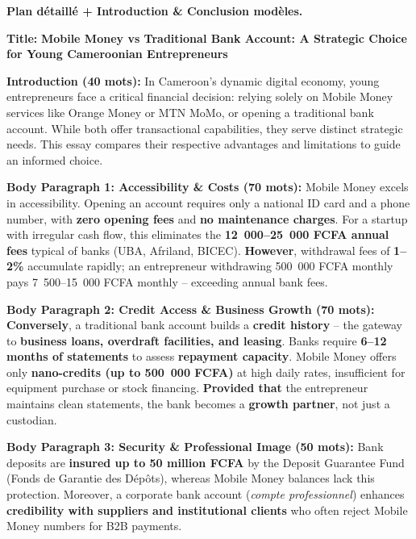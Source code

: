\documentclass[11pt]{article}
\begin{document}
\begin{exoresolu}
\textbf{Plan détaillé + Introduction \& Conclusion modèles.}

\textbf{Title:} \textbf{Mobile Money vs Traditional Bank Account: A Strategic Choice for Young Cameroonian Entrepreneurs}

\textbf{Introduction (40 mots):}
In Cameroon's dynamic digital economy, young entrepreneurs face a critical financial decision: relying solely on Mobile Money services like Orange Money or MTN MoMo, or opening a traditional bank account. While both offer transactional capabilities, they serve distinct strategic needs. This essay compares their respective advantages and limitations to guide an informed choice.

\textbf{Body Paragraph 1: Accessibility \& Costs (70 mots):}
Mobile Money excels in accessibility. Opening an account requires only a national ID card and a phone number, with \textbf{zero opening fees} and \textbf{no maintenance charges}. For a startup with irregular cash flow, this eliminates the \textbf{12~000--25~000 FCFA annual fees} typical of banks (UBA, Afriland, BICEC). \textbf{However}, withdrawal fees of \textbf{1--2\%} accumulate rapidly; an entrepreneur withdrawing 500~000 FCFA monthly pays 7~500--15~000 FCFA monthly -- exceeding annual bank fees.

\textbf{Body Paragraph 2: Credit Access \& Business Growth (70 mots):}
\textbf{Conversely}, a traditional bank account builds a \textbf{credit history} -- the gateway to \textbf{business loans, overdraft facilities, and leasing}. Banks require \textbf{6--12 months of statements} to assess \textbf{repayment capacity}. Mobile Money offers only \textbf{nano-credits (up to 500~000 FCFA)} at high daily rates, insufficient for equipment purchase or stock financing. \textbf{Provided that} the entrepreneur maintains clean statements, the bank becomes a \textbf{growth partner}, not just a custodian.

\textbf{Body Paragraph 3: Security \& Professional Image (50 mots):}
Bank deposits are \textbf{insured up to 50 million FCFA} by the Deposit Guarantee Fund (Fonds de Garantie des Dépôts), whereas Mobile Money balances lack this protection. Moreover, a corporate bank account (\textit{compte professionnel}) enhances \textbf{credibility with suppliers and institutional clients} who often reject Mobile Money numbers for B2B payments.


\end{exoresolu}
\end{document}
